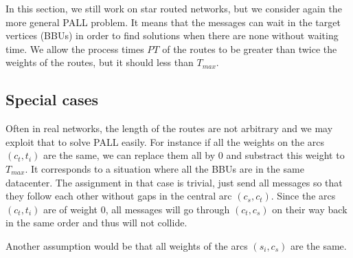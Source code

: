 \documentclass[10pt, conference, letterpaper]{IEEEtran}
\begin{document}
    In this section, we still work on star routed networks, but we consider again the more general PALL problem. It means that the messages can wait in the target vertices (BBUs) in order to find solutions when there are none without waiting time. We allow the process times $PT$ of the routes to be greater than twice the weights of the routes, but it should less than $T_{max}$.

	\subsection{Special cases}
		
		
	Often in real networks, the length of the routes are not arbitrary and we may exploit that to solve PALL easily. For instance if all the weights on the arcs $(c_t,t_i)$ are the same, we can replace them all by $0$ and substract this weight to $T_{max}$. It corresponds to a situation where all the BBUs are in the same datacenter.
	The assignment in that case is trivial, just send all messages so that they follow each other without gaps in the central arc $(c_s,c_t)$. Since the arcs $(c_t,t_i)$ are of weight $0$, all messages will go through $(c_t,c_s)$ on their way back in
	the same order and thus will not collide. 
	
	Another assumption would be that all weights of the arcs $(s_i,c_s)$ are the same.
	
\end{document}
